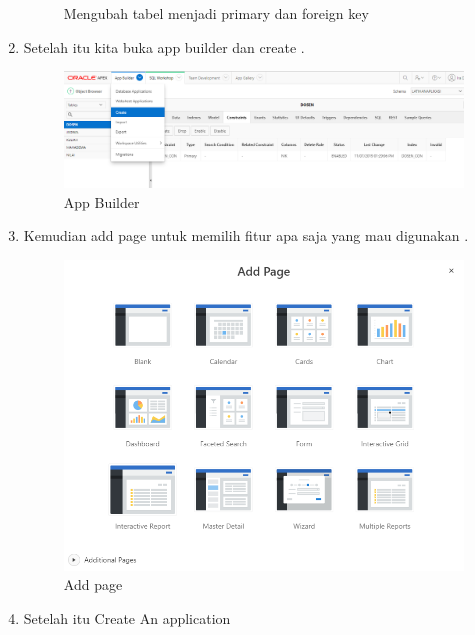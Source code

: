 \begin{enumerate}
\begin{figure}[!htbp]
    \caption{Mengubah tabel menjadi primary dan foreign key}
    \label{fig:my_label}
\end{figure}
\newline
\item Setelah itu kita buka app builder dan create .
\newline
\begin{figure}[!htbp]
    \centering
    \includegraphics[scale=0.5]{figures/24.png}
    \caption{App Builder}
    \label{fig:my_label}
\end{figure}
\newline
\item Kemudian add page untuk memilih fitur apa saja yang mau digunakan . 
\newline
\begin{figure}[!htbp]
    \centering
    \includegraphics[scale=0.5]{figures/26.png}
    \caption{Add page}
    \label{fig:my_label}
\end{figure}
\newline
\item Setelah itu Create An application 
\newline
\begin{figure}[!htbp]

\end{figure}
\end{enumerate}
